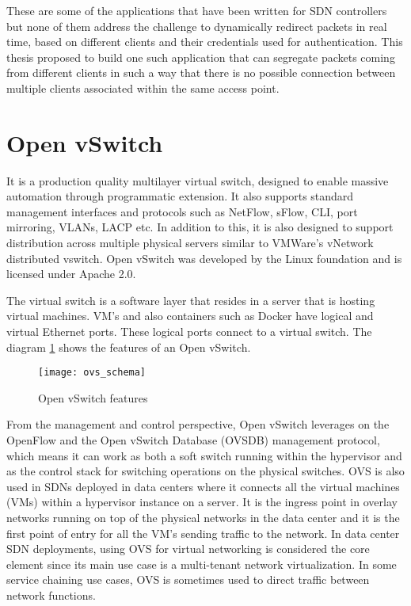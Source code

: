 These are some of the applications that have been written for SDN controllers but none of them address the challenge to dynamically redirect packets in real time, based on different clients and their credentials used for authentication. This thesis proposed to build one such application that can segregate packets coming from different clients in such a way that there is no possible connection between multiple clients associated within the same access point.

\section{Open vSwitch \cite{OpenVswitch_design}} \label{OpenvSwitch}
It is a production quality multilayer virtual switch, designed to enable massive automation through programmatic extension. It also supports standard management interfaces and protocols such as NetFlow, sFlow, CLI, port mirroring, VLANs, LACP etc. In addition to this, it is also designed to support distribution across multiple physical servers similar to VMWare’s vNetwork distributed vswitch. Open vSwitch was developed by the Linux foundation and is licensed under Apache 2.0.

The virtual switch is a software layer that resides in a server that is hosting virtual machines. VM’s and also containers such as Docker have logical and virtual Ethernet ports. These logical ports connect to a virtual switch. The diagram \ref{fig:OVS_Features} shows the features of an Open vSwitch. \cite{WhatisOVS}
\begin{figure}
	\centering
	\texttt{[image: ovs\_schema]}
	\caption{Open vSwitch features \cite{ovs_features}} \label{fig:OVS_Features}
	\vspace{-10pt}
\end{figure}

From the management and control perspective, Open vSwitch leverages on the OpenFlow and the Open vSwitch Database (OVSDB) management protocol, which means it can work as both a soft switch running within the hypervisor and as the control stack for switching operations on the physical switches. OVS is also used in SDNs deployed in data centers where it connects all the virtual machines (VMs) within a hypervisor instance on a server. It is the ingress point in overlay networks running on top of the physical networks in the data center and it is the first point of entry for all the VM’s sending traffic to the network. In data center SDN deployments, using OVS for virtual networking is considered the core element since its main use case is a multi-tenant network virtualization. In some service chaining use cases, OVS is sometimes used to direct traffic between network functions.

